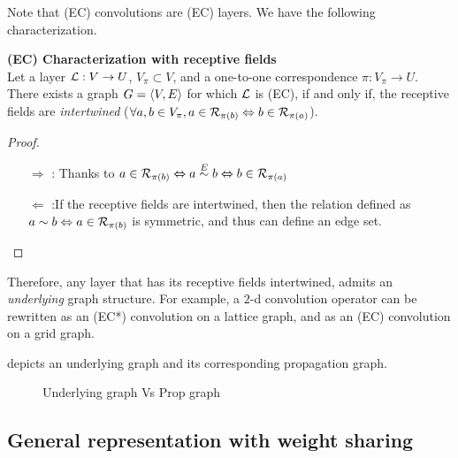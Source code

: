 Note that (EC) convolutions are (EC) layers. We have the following characterization.

\begin{proposition}\textbf{(EC) Characterization with receptive fields}\\
Let a layer $\mathcal{L}: V \rightarrow U$, $V_\pi \subset V$, and a one-to-one correspondence $\pi: V_\pi \rightarrow U$. There exists a graph $G = \langle V, E \rangle$ for which $\mathcal{L}$ is (EC), if and only if, the receptive fields are \emph{intertwined} (\ie $\forall a,b \in V_\pi, a \in \mathcal{R}_{\pi(b)} \Leftrightarrow b \in \mathcal{R}_{\pi(a)} $).
\end{proposition}
\begin{proof}
\begin{enumerate}
  \item[$\Rightarrow$]: Thanks to $a \in \mathcal{R}_{\pi(b)} \Leftrightarrow a \overset{E}\sim b \Leftrightarrow b \in \mathcal{R}_{\pi(a)}$
  \item[$\Leftarrow$]:If the receptive fields are intertwined, then the relation defined as $a \sim b \Leftrightarrow a \in \mathcal{R}_{\pi(b)}$ is symmetric, and thus can define an edge set.
\end{enumerate}
\end{proof}

Therefore, any layer that has its receptive fields intertwined, admits an \emph{underlying} graph structure. For example, a $2$-d convolution operator can be rewritten as an (EC*) convolution on a lattice graph, and as an (EC) convolution on a grid graph.

 depicts an underlying graph and its corresponding propagation graph.

\begin{figure}[H]
\centering
{}
\caption{Underlying graph Vs Prop graph}
\label{fig:upgraph}
\end{figure}

\subsection{General representation with weight sharing}

